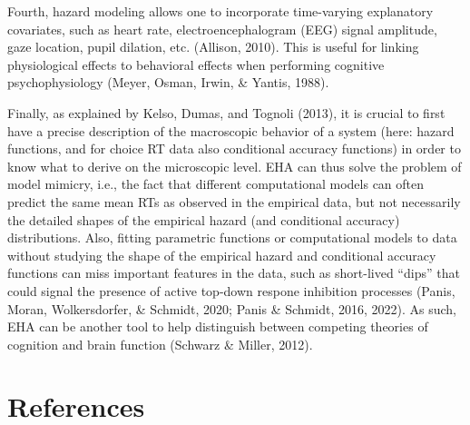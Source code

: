 \documentclass[
  english,
  man,floatsintext]{apa6}
\begin{document}
Fourth, hazard modeling allows one to incorporate time-varying explanatory covariates, such as heart rate, electroencephalogram (EEG) signal amplitude, gaze location, pupil dilation, etc. (Allison, 2010). This is useful for linking physiological effects to behavioral effects when performing cognitive psychophysiology (Meyer, Osman, Irwin, \& Yantis, 1988).

Finally, as explained by Kelso, Dumas, and Tognoli (2013), it is crucial to first have a precise description of the macroscopic behavior of a system (here: hazard functions, and for choice RT data also conditional accuracy functions) in order to know what to derive on the microscopic level. EHA can thus solve the problem of model mimicry, i.e., the fact that different computational models can often predict the same mean RTs as observed in the empirical data, but not necessarily the detailed shapes of the empirical hazard (and conditional accuracy) distributions. Also, fitting parametric functions or computational models to data without studying the shape of the empirical hazard and conditional accuracy functions can miss important features in the data, such as short-lived ``dips'' that could signal the presence of active top-down respone inhibition processes (Panis, Moran, Wolkersdorfer, \& Schmidt, 2020; Panis \& Schmidt, 2016, 2022). As such, EHA can be another tool to help distinguish between competing theories of cognition and brain function (Schwarz \& Miller, 2012).

\section*{References}\label{references}
\end{document}
